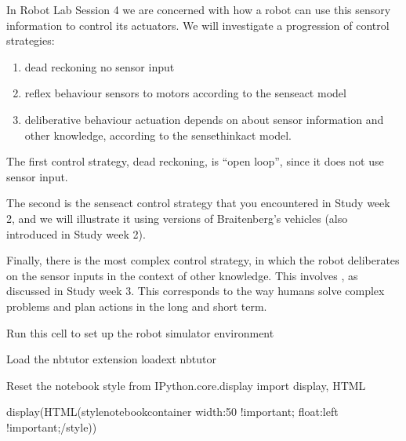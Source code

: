 \documentclass[letterpaper,10pt,english]{sphinxmanual}
\begin{document}
{In Robot Lab Session 4 we are concerned with how a robot can use this sensory information to control its actuators. We will investigate a progression of control strategies:
\begin{enumerate}
%
\item {} 
dead reckoning \textendash{} no sensor input

\item {} 
reflex behaviour \textendash{} sensors  to motors according to the sense\textendash{}act model

\item {} 
deliberative behaviour \textendash{} actuation depends on  about sensor information and other knowledge, according to the sense\textendash{}think\textendash{}act model.

\end{enumerate}

The first control strategy, dead reckoning, is “open loop”, since it does not use sensor input.

The second is the sense\textendash{}act control strategy that you encountered in Study week 2, and we will illustrate it using versions of Braitenberg’s vehicles (also introduced in Study week 2).

Finally, there is the most complex control strategy, in which the robot deliberates on the sensor inputs in the context of other knowledge. This involves , as discussed in Study week 3. This corresponds to the way humans solve complex problems and plan actions in the long and short term.

{
\begin{sphinxVerbatim}[commandchars=\\\{\}]
\llap{\color{nbsphinxin}[ ]:\,\hspace{\fboxrule}\hspace{\fboxsep}}\PYGZsh{} Run this cell to set up the robot simulator environment

\PYGZsh{}Load the nbtutor extension
\PYGZpc{}load\PYGZus{}ext nbtutor

\PYGZsh{}Reset the notebook style
from IPython.core.display import display, HTML

display(HTML(\PYGZdq{}\PYGZlt{}style\PYGZgt{}\PYGZsh{}notebook\PYGZhy{}container \PYGZob{} width:50\PYGZpc{} !important; float:left !important;\PYGZcb{}\PYGZlt{}/style\PYGZgt{}\PYGZdq{}))



\end{sphinxVerbatim}}}
\end{document}
